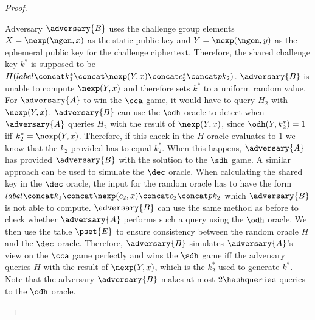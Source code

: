 \begin{proof}
\begin{itemize}
                                                                Adversary $\adversary{B}$ uses the challenge group elements $X = \nexp(\ngen, x)$ as the static public key and $Y = \nexp(\ngen, y)$ as the ephemeral public key for the challenge ciphertext.
                                                                Therefore, the shared challenge key $k^*$ is supposed to be $H(label \concat k^*_1 \concat \nexp(Y, x) \concat c^*_2 \concat pk_2)$.
                                                                $\adversary{B}$ is unable to compute $\nexp(Y, x)$ and therefore sets $k^*$ to a uniform random value.
                                                                For $\adversary{A}$ to win the $\cca$ game, it would have to query $H_2$ with $\nexp(Y, x)$.
                                                                $\adversary{B}$ can use the $\odh$ oracle to detect when $\adversary{A}$ queries $H_2$ with the result of $\nexp(Y, x)$, since $\odh(Y, k^*_2) = 1$ iff $k^*_2 = \nexp(Y, x)$.
                                                                Therefore, if this check in the $H$ oracle evaluates to $1$ we know that the $k_2$ provided has to equal $k^*_2$.
                                                                When this happens, $\adversary{A}$ has provided $\adversary{B}$ with the solution to the $\sdh$ game.
                                                                A similar approach can be used to simulate the $\dec$ oracle.
                                                                When calculating the shared key in the $\dec$ oracle, the input for the random oracle has to have the form $label \concat k_1 \concat \nexp(c_2, x) \concat c_2 \concat pk_2$ which $\adversary{B}$ is not able to compute.
                                                                $\adversary{B}$ can use the same method as before to check whether $\adversary{A}$ performs such a query using the $\odh$ oracle.
                                                                We then use the table $\pset{E}$ to ensure consistency between the random oracle $H$ and the $\dec$ oracle.
                                                                Therefore, $\adversary{B}$ simulates $\adversary{A}$'s view on the $\cca$ game perfectly and wins the $\sdh$ game iff the adversary queries $H$ with the result of $\nexp(Y, x)$, which is the $k^*_2$ used to generate $k^*$.
                                                                Note that the adversary $\adversary{B}$ makes at most $2 \hashqueries$ queries to the $\odh$ oracle.


\end{itemize}
\end{proof}
